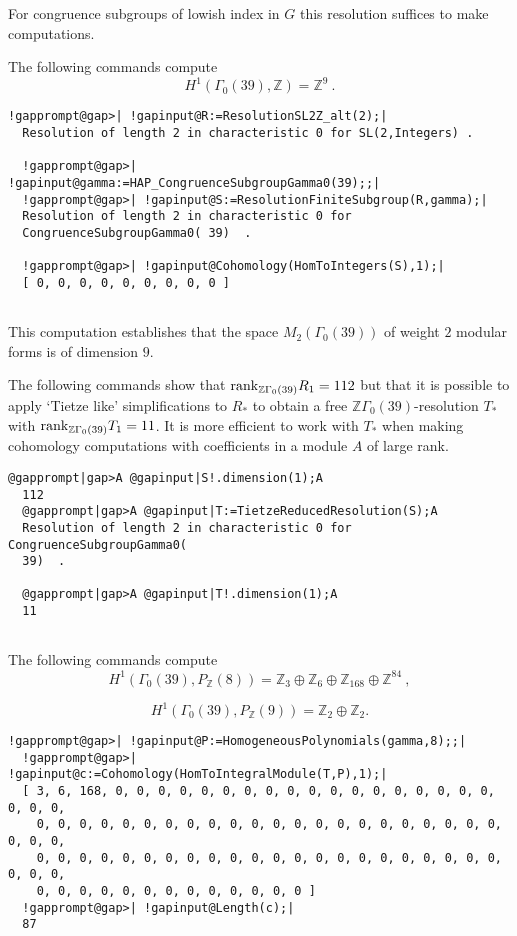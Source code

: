 \documentclass[a4paper,11pt]{report}
\begin{document}
{{For congruence subgroups of lowish index in $G$ this resolution suffices to make computations. 

The following commands compute 
\[H^1(\Gamma_0(39),\mathbb Z) = \mathbb Z^9\ .\]
 
\begin{Verbatim}[commandchars=!@|,fontsize=\small,frame=single,label=Example]
  !gapprompt@gap>| !gapinput@R:=ResolutionSL2Z_alt(2);|
  Resolution of length 2 in characteristic 0 for SL(2,Integers) .
  
  !gapprompt@gap>| !gapinput@gamma:=HAP_CongruenceSubgroupGamma0(39);;|
  !gapprompt@gap>| !gapinput@S:=ResolutionFiniteSubgroup(R,gamma);|
  Resolution of length 2 in characteristic 0 for 
  CongruenceSubgroupGamma0( 39)  .
  
  !gapprompt@gap>| !gapinput@Cohomology(HomToIntegers(S),1);|
  [ 0, 0, 0, 0, 0, 0, 0, 0, 0 ]
  
\end{Verbatim}
 

This computation establishes that the space $M_2(\Gamma_0(39))$ of weight $2$ modular forms is of dimension $9$. 

The following commands show that ${\rm rank}_{\mathbb Z\Gamma_0(39)} R_1 = 112$ but that it is possible to apply `Tietze like' simplifications to $R_\ast$ to obtain a free $\mathbb Z\Gamma_0(39)$-resolution $T_\ast$ with ${\rm rank}_{\mathbb Z\Gamma_0(39)} T_1 = 11$. It is more efficient to work with $T_\ast$ when making cohomology computations with coefficients in a module $A$ of large rank. 
\begin{Verbatim}[commandchars=@|A,fontsize=\small,frame=single,label=Example]
  @gapprompt|gap>A @gapinput|S!.dimension(1);A
  112
  @gapprompt|gap>A @gapinput|T:=TietzeReducedResolution(S);A
  Resolution of length 2 in characteristic 0 for CongruenceSubgroupGamma0(
  39)  . 
  
  @gapprompt|gap>A @gapinput|T!.dimension(1);A
  11
  
\end{Verbatim}
 

The following commands compute 
\[H^1(\Gamma_0(39),P_{\mathbb Z}(8)) = \mathbb Z_3 \oplus \mathbb Z_6 \oplus
\mathbb Z_{168} \oplus \mathbb Z^{84}\ ,\]
 
\[H^1(\Gamma_0(39),P_{\mathbb Z}(9)) = \mathbb Z_2 \oplus \mathbb Z_2 .\]
 
\begin{Verbatim}[commandchars=!@|,fontsize=\small,frame=single,label=Example]
  !gapprompt@gap>| !gapinput@P:=HomogeneousPolynomials(gamma,8);;|
  !gapprompt@gap>| !gapinput@c:=Cohomology(HomToIntegralModule(T,P),1);|
  [ 3, 6, 168, 0, 0, 0, 0, 0, 0, 0, 0, 0, 0, 0, 0, 0, 0, 0, 0, 0, 0, 0, 0, 0, 
    0, 0, 0, 0, 0, 0, 0, 0, 0, 0, 0, 0, 0, 0, 0, 0, 0, 0, 0, 0, 0, 0, 0, 0, 0, 
    0, 0, 0, 0, 0, 0, 0, 0, 0, 0, 0, 0, 0, 0, 0, 0, 0, 0, 0, 0, 0, 0, 0, 0, 0, 
    0, 0, 0, 0, 0, 0, 0, 0, 0, 0, 0, 0, 0 ]
  !gapprompt@gap>| !gapinput@Length(c);|
  87
  

\end{Verbatim}}}
\end{document}
